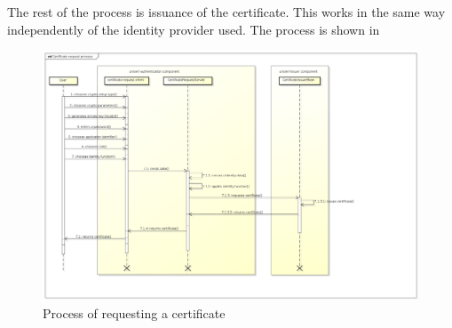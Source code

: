 \documentclass[oneside]{scrreprt}
\begin{document}
The rest of the process is issuance of the certificate. This works in the same way independently of the identity provider used. The process is shown in 

\begin{figure}[ht]
\centerline{
\includegraphics[width=1.0\textwidth]{figs/certificate_request_process}}
\caption{Process of requesting a certificate}
\label{fig:request_process}
\end{figure}

\end{document}
